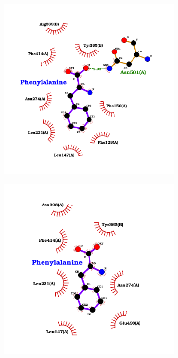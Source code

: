 \documentclass[12pt]{article}
\begin{document}
	\FloatBarrier
	\begin{figure}[h!]
		\centering
		\begin{subfigure}[h!]{0.35\textwidth}
			\hspace{2cm}
			\includegraphics[width=\textwidth]{../1/Dock/best.png}
			\caption{}
		\end{subfigure}
		\hfill
		\begin{subfigure}[h!]{0.35\textwidth}
			\hspace{-2cm}
			\includegraphics[width=\textwidth]{../1/Dock/best2.png}

\end{subfigure}
\end{figure}
\end{document}
